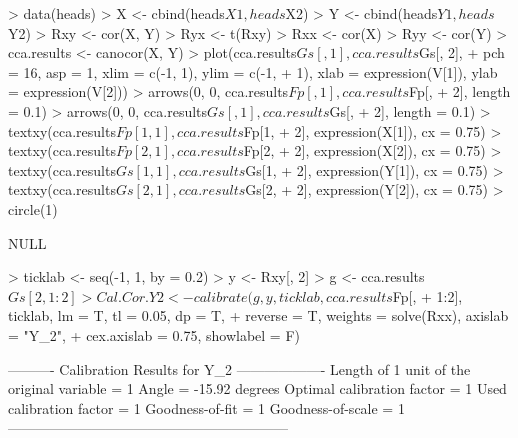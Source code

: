 \documentclass[a4paper]{article}
\begin{document}
\begin{Schunk}
\begin{Sinput}
> data(heads)
> X <- cbind(heads$X1, heads$X2)
> Y <- cbind(heads$Y1, heads$Y2)
> Rxy <- cor(X, Y)
> Ryx <- t(Rxy)
> Rxx <- cor(X)
> Ryy <- cor(Y)
> cca.results <- canocor(X, Y)
> plot(cca.results$Gs[, 1], cca.results$Gs[, 2], 
+     pch = 16, asp = 1, xlim = c(-1, 1), ylim = c(-1, 
+         1), xlab = expression(V[1]), ylab = expression(V[2]))
> arrows(0, 0, cca.results$Fp[, 1], cca.results$Fp[, 
+     2], length = 0.1)
> arrows(0, 0, cca.results$Gs[, 1], cca.results$Gs[, 
+     2], length = 0.1)
> textxy(cca.results$Fp[1, 1], cca.results$Fp[1, 
+     2], expression(X[1]), cx = 0.75)
> textxy(cca.results$Fp[2, 1], cca.results$Fp[2, 
+     2], expression(X[2]), cx = 0.75)
> textxy(cca.results$Gs[1, 1], cca.results$Gs[1, 
+     2], expression(Y[1]), cx = 0.75)
> textxy(cca.results$Gs[2, 1], cca.results$Gs[2, 
+     2], expression(Y[2]), cx = 0.75)
> circle(1)
\end{Sinput}
\begin{Soutput}
NULL
\end{Soutput}
\begin{Sinput}
> ticklab <- seq(-1, 1, by = 0.2)
> y <- Rxy[, 2]
> g <- cca.results$Gs[2, 1:2]
> Cal.Cor.Y2 <- calibrate(g, y, ticklab, cca.results$Fp[, 
+     1:2], ticklab, lm = T, tl = 0.05, dp = T, 
+     reverse = T, weights = solve(Rxx), axislab = "Y_2", 
+     cex.axislab = 0.75, showlabel = F)
\end{Sinput}
\begin{Soutput}
---------- Calibration Results for  Y_2  -------------------
Length of 1 unit of the original variable =  1  
Angle                                     =  -15.92 degrees
Optimal calibration factor                =  1  
Used calibration factor                   =  1  
Goodness-of-fit                           =  1  
Goodness-of-scale                         =  1  
------------------------------------------------------------
\end{Soutput}
\end{Schunk}
\end{document}

